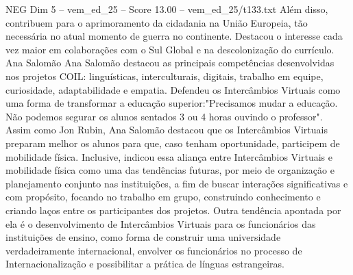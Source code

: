 \begin{textsample}{NEG Dim 5 – vem\_ed\_25 – Score 13.00 – vem\_ed\_25/t133.txt}
Além disso, contribuem para o aprimoramento da cidadania na União Europeia, tão necessária no atual momento de guerra no continente.
Destacou o interesse cada vez maior em colaborações com o Sul Global e na descolonização do currículo.
Ana Salomão Ana Salomão destacou as principais competências desenvolvidas nos projetos COIL: linguísticas, interculturais, digitais, trabalho em equipe, curiosidade, adaptabilidade e empatia.
Defendeu os Intercâmbios Virtuais como uma forma de transformar a educação superior:"Precisamos mudar a educação.
Não podemos segurar os alunos sentados 3 ou 4 horas ouvindo o professor".
Assim como Jon Rubin, Ana Salomão destacou que os Intercâmbios Virtuais preparam melhor os alunos para que, caso tenham oportunidade, participem de mobilidade física.
Inclusive, indicou essa aliança entre Intercâmbios Virtuais e mobilidade física como uma das tendências futuras, por meio de organização e planejamento conjunto nas instituições, a fim de buscar interações significativas e com propósito, focando no trabalho em grupo, construindo conhecimento e criando laços entre os participantes dos projetos.
Outra tendência apontada por ela é o desenvolvimento de Intercâmbios Virtuais para os funcionários das instituições de ensino, como forma de construir uma universidade verdadeiramente internacional, envolver os funcionários no processo de Internacionalização e possibilitar a prática de línguas estrangeiras.

\end{textsample}
